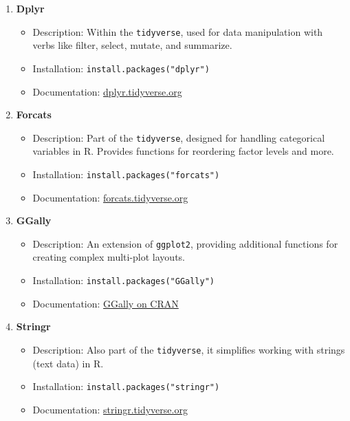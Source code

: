 \documentclass[11pt]{article}\usepackage[]{graphicx}\usepackage[]{xcolor}
\begin{document}
\begin{enumerate}
    \item \textbf{Dplyr}
    \begin{itemize}[noitemsep]
        \item Description: Within the \texttt{tidyverse}, used for data manipulation with verbs like filter, select, mutate, and summarize.
        \item Installation: \texttt{install.packages("dplyr")}
        \item Documentation: \href{https://dplyr.tidyverse.org/}{dplyr.tidyverse.org}
    \end{itemize}

    \item \textbf{Forcats}
    \begin{itemize}[noitemsep]
        \item Description: Part of the \texttt{tidyverse}, designed for handling categorical variables in R. Provides functions for reordering factor levels and more.
        \item Installation: \texttt{install.packages("forcats")}
        \item Documentation: \href{https://forcats.tidyverse.org/}{forcats.tidyverse.org}
    \end{itemize}

    \item \textbf{GGally}
    \begin{itemize}[noitemsep]
        \item Description: An extension of \texttt{ggplot2}, providing additional functions for creating complex multi-plot layouts.
        \item Installation: \texttt{install.packages("GGally")}
        \item Documentation: \href{https://cran.r-project.org/web/packages/GGally/index.html}{GGally on CRAN}
    \end{itemize}

    \item \textbf{Stringr}
    \begin{itemize}[noitemsep]
        \item Description: Also part of the \texttt{tidyverse}, it simplifies working with strings (text data) in R.
        \item Installation: \texttt{install.packages("stringr")}
        \item Documentation: \href{https://stringr.tidyverse.org/}{stringr.tidyverse.org}
    \end{itemize}
\end{enumerate}
\end{document}
